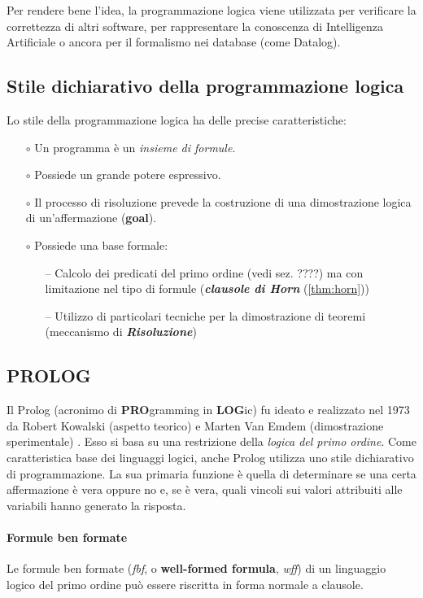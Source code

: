 \documentclass[11pt]{article}
\begin{document}
Per rendere bene l'idea, la programmazione logica viene utilizzata per verificare la correttezza di altri software, per rappresentare la conoscenza di Intelligenza Artificiale o ancora per il formalismo nei database (come Datalog).

\subsection{Stile dichiarativo della programmazione logica}
Lo stile della programmazione logica ha delle precise caratteristiche:
\begin{itemize}
 	\item[$\circ$] Un programma è un \textit{insieme di formule}.
 	\item[$\circ$] Possiede un grande potere espressivo.
 	\item[$\circ$] Il processo di risoluzione prevede la costruzione di una dimostrazione logica di un'affermazione (\textbf{goal}).
 	\item[$\circ$] Possiede una \color{red}base formale\color{black}:
 	\begin{itemize}
 		\item[--] Calcolo dei predicati del primo ordine (vedi sez. ????) ma con limitazione nel tipo di formule (\textbf{\emph{clausole di Horn}} (\ref{thm:horn}))
 		\item[--] Utilizzo di particolari tecniche per la dimostrazione di teoremi (meccanismo di \textbf{\emph{Risoluzione}})
 	\end{itemize}
\end{itemize}

\subsection{PROLOG}
Il Prolog (acronimo di \textbf{PRO}gramming in \textbf{LOG}ic) fu ideato e realizzato nel 1973 da Robert Kowalski (aspetto teorico) e Marten Van Emdem (dimostrazione sperimentale) . Esso si basa su una restrizione della \textit{logica del primo ordine}. Come caratteristica base dei linguaggi logici, anche Prolog utilizza uno stile dichiarativo di programmazione. La sua primaria funzione è quella di determinare se una certa affermazione è vera oppure no e, se è vera, quali vincoli sui valori attribuiti alle variabili hanno generato la risposta.


\paragraph{Formule ben formate} Le formule ben formate (\textit{fbf}, o \textbf{well-formed formula}, \textit{wff}) di un linguaggio logico del primo ordine può essere riscritta in \color{red}forma normale a clausole\color{black}.
\end{document}
